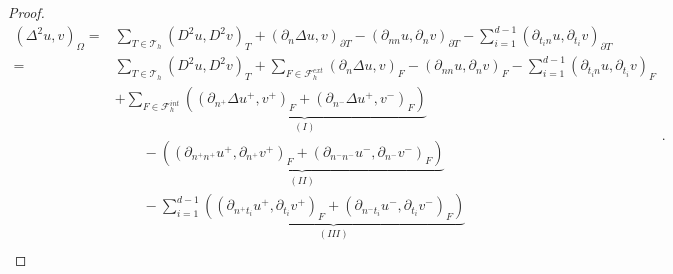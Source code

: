 \begin{proof}
\begin{equation*}
    \begin{split}
 ( \Delta  ^{2} u,v ) _{\Omega }  =&\sum_{T\in \mathcal{T} _{h}}^{} ( D^2u,D^2v ) _{T }  + (\partial _{n} \Delta  u,v)_{\partial T} - (\partial _{nn} u, \partial _{n}v )_{\partial T}  - \sum_{i=1}^{d-1} ( \partial _{t_{i}n}u , \partial _{t_{i}} v  )_{\partial T}   \\
= &\sum_{T\in \mathcal{T} _{h}}^{} ( D^2u,D^2v ) _{T }  + \sum_{F \in \mathcal{F}_{h}^{ext} }^{}  (\partial _{n} \Delta  u,v)_{F} - (\partial _{nn} u, \partial _{n}v )_{F}  - \sum_{i=1}^{d-1} ( \partial _{ t_{i}n} u , \partial _{t_{i}} v
)_{F}     \\
   &  + \sum_{F \in \mathcal{F} _{h}^{int}}^{} \underbrace{\left( (\partial _{n^{+}} \Delta  u^{+}
        ,v^{+} )_{F}
+ \left(\partial _{n^{-}} \Delta  u^{+} ,v^{-}\right)_{F}  \right)}_{(I)}    \\
    &\quad \quad  -
\underbrace{\left( \left(\partial _{n^{+}n^{+}} u^{+}, \partial _{n^{+}} v^{+} \right) _{F} + \left(\partial _{n^{-}n^{-}} u^{-}, \partial _{n^{-}} v^{-}
\right) _{F} \right) }_{(II)} \\
   &  \quad \quad - \sum_{i=1}^{d-1}\underbrace{( (\partial _{n^{+}t_{i}} u^{+}, \partial_{t_{i}} v^{+} )_{F} +  \left(\partial _{n^{-}t_{i}} u^{-},
        \partial_{t_{i}} v^{-}
\right)_{F} ) }_{(III)} \\
    \end{split}
.\end{equation*}


\end{proof}
